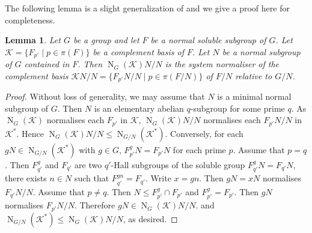\documentclass[12pt,a4paper]{article}
\DeclareMathOperator{\N}{N}
\DeclareMathOperator{\Q}{Q}
\newtheorem{lemma}[theorem]{Lemma}
\theoremstyle{definition}
\begin{document}

The following lemma is a slight generalization of \cite[Theorem~I.5.8]{DoerkHawkes1992} and we give a proof here for completeness.


\begin{lemma}\label{lem-system-normaliser}
Let $G$ be a group and let $F$ be a normal soluble subgroup of $G$.
Let $\mathcal{K}=\{F_{p'} \mid p \in \pi(F)\}$ be a complement basis of $F$. Let $N$ be a normal subgroup of $G$ contained in $F$. Then $\N_G(\mathcal{K})N/N$ is the system normaliser of the complement basis $\mathcal{K}N/N=\{F_{p'}N/N \mid p \in \pi(F/N)\}$ of $F/N$ relative to $G/N$.
\end{lemma}
\begin{proof}
Without loss of generality, we may assume that $N$ is a minimal normal subgroup of $G$. Then $N$ is an elementary abelian $q$-subgroup for some prime $q$.
As $\N_G(\mathcal{K})$ normalises each $F_{p'}$ in $\mathcal{K}$, $\N_G(\mathcal{K})N/N$ normalises each $F_{p'}N/N$ in $\mathcal{K}^\ast$. Hence
$\N_G(\mathcal{K})N/N \leq \N_{G/N}(\mathcal{K}^\ast).$ Conversely, for each $gN \in \N_{G/N}(\mathcal{K}^\ast)$ with $g \in G$,
$F_{p'}^gN=F_{p'}N$ for each prime $p$.
Assume that $p = q$. Then $F_{q'}^g$ and $F_{q'}$ are two $q'$-Hall subgroups of the soluble group $F_{q'}^g N=F_{q'}N$, there exists $n \in N$ such that $F_{q'}^{gn}=F_{q'}$. Write $x=gn$. Then $gN = xN$ normalises $F_{q'}N/N$. Assume that $p \neq q$. Then $N \leq F_{p'}^g \cap  F_{p'}$ and $F_{p'}^g=F_{p'}$. Then $gN$ normalises $F_{p'}N/N$. Therefore $gN \in \N_G(\mathcal{K})N/N$.
and $\N_{G/N}(\mathcal{K}^\ast) \leq \N_G(\mathcal{K})N/N$, as desired.
\end{proof}



\end{document}
